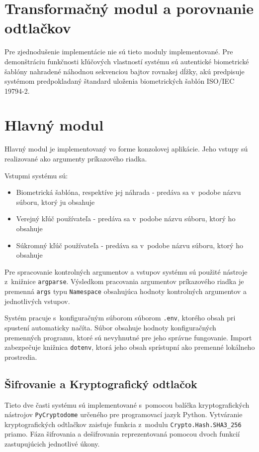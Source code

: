 \section{Transformačný modul a porovnanie odtlačkov}
Pre zjednodušenie implementácie nie sú tieto moduly implementované. Pre demonštráciu funkčnosti kľúčových vlastností systému sú autentické biometrické šablóny nahradené náhodnou sekvenciou bajtov rovnakej dĺžky, akú predpisuje systémom predpokladaný štandard uloženia biometrických šablón ISO/IEC 19794-2.

\section{Hlavný modul}
Hlavný modul je implementovaný vo forme konzolovej aplikácie. Jeho vstupy sú realizované ako argumenty príkazového riadka.

Vstupmi systému sú:

\begin{itemize}
  \item{Biometrická šablóna, respektíve jej náhrada - predáva sa v~podobe názvu súboru, ktorý ju obsahuje}
  \item{Verejný kľúč používateľa - predáva sa v~podobe názvu súboru, ktorý ho obsahuje}
  \item{Súkromný kľúč používateľa - predáva sa v~podobe názvu súboru, ktorý ho obsahuje}
\end{itemize}

Pre spracovanie kontrolných argumentov a vstupov systému sú použité nástroje z~knižnice \texttt{argparse}. Výsledkom pracovania argumentov príkazového riadka je premenná \texttt{args} typu \texttt{Namespace} obsahujúca hodnoty kontrolných argumentov a jednotlivých vstupov.

Systém pracuje s~konfiguračným súborom súborom \texttt{.env}, ktorého obsah pri spustení automaticky načíta. Súbor obsahuje hodnoty konfiguračných premenných programu, ktoré sú nevyhnutné pre jeho správne fungovanie. Import zabezpečuje knižnica \texttt{dotenv}, ktorá jeho obsah sprístupní ako premenné lokálneho prostredia.

\subsection{Šifrovanie a Kryptografický odtlačok}
Tieto dve časti systému sú implementované s~pomocou balíčka kryptografických nástrojov \texttt{PyCryptodome} určeného pre programovací jazyk Python. Vytváranie kryptografických odtlačkov zaisťuje funkcia z~modulu \texttt{Crypto.Hash.SHA3\_256} priamo. Fáza šifrovania a dešifrovania reprezentovaná pomocou dvoch funkcií zastupujúcich jednotlivé úkony.
 
